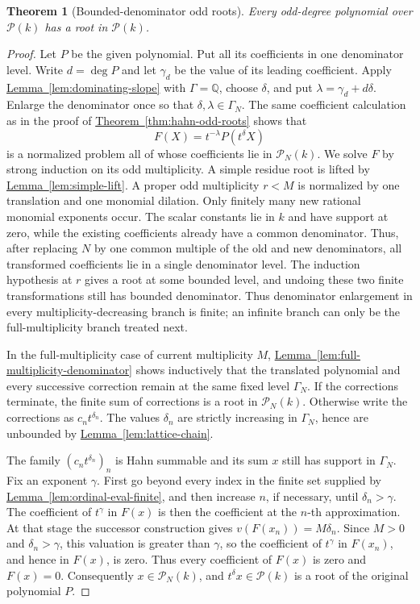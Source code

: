 \documentclass[11pt]{article}
\newcommand{\Puiseux}{\mathcal P(k)}
\newcommand{\Val}{v}
\newcommand{\namedref}[2]{\hyperref[#2]{#1~\ref*{#2}}}
\theoremstyle{proofnote}
\newtheorem{theorem}{Theorem}[section]
\begin{document}
\begin{theorem}[Bounded-denominator odd roots]
\label{thm:puiseux-odd-roots}
  Every odd-degree polynomial over \(\Puiseux\) has a root in \(\Puiseux\).
\end{theorem}
\begin{proof}
  Let \(P\) be the given polynomial.  Put all its coefficients in one
  denominator level.  Write \(d=\deg P\) and let \(\gamma_d\) be the value of
  its leading coefficient.  Apply \namedref{Lemma}{lem:dominating-slope} with
  \(\Gamma=\mathbb Q\), choose \(\delta\), and put
  \(\lambda=\gamma_d+d\delta\).  Enlarge the denominator once so that
  \(\delta,\lambda\in\Gamma_N\).  The same coefficient calculation as in
  the proof of \namedref{Theorem}{thm:hahn-odd-roots} shows that
  \[
    F(X)=t^{-\lambda}P(t^\delta X)
  \]
  is a normalized problem all of whose coefficients lie in
  \(\mathcal P_N(k)\).  We solve \(F\) by strong induction on its odd
  multiplicity.
  A simple residue root is lifted by \namedref{Lemma}{lem:simple-lift}.  A proper
  odd multiplicity \(r<M\) is normalized by one translation and one monomial
  dilation.  Only finitely many new rational monomial exponents occur.
  The scalar constants lie in \(k\) and have support at zero, while the
  existing coefficients already have a common denominator.  Thus, after
  replacing \(N\) by one common multiple of the old and new denominators,
  all transformed coefficients lie in a single denominator level.  The induction hypothesis at \(r\) gives a root
  at some bounded level, and undoing these two finite transformations still
  has bounded denominator.  Thus denominator enlargement in every
  multiplicity-decreasing branch is finite; an infinite branch can only be
  the full-multiplicity branch treated next.

  In the full-multiplicity case of current multiplicity \(M\),
  \namedref{Lemma}{lem:full-multiplicity-denominator}
  shows inductively that the translated polynomial and every successive
  correction remain at the same fixed level \(\Gamma_N\).  If the corrections
  terminate, the finite sum of corrections is a root in
  \(\mathcal P_N(k)\).  Otherwise write the corrections as
  \(c_nt^{\delta_n}\).  The values \(\delta_n\) are strictly increasing in
  \(\Gamma_N\), hence are unbounded by \namedref{Lemma}{lem:lattice-chain}.

  The family \((c_nt^{\delta_n})_n\) is Hahn summable and its sum \(x\)
  still has support in \(\Gamma_N\).  Fix an exponent \(\gamma\).  First go
  beyond every index in the finite set supplied by
  \namedref{Lemma}{lem:ordinal-eval-finite}, and then increase \(n\), if
  necessary, until \(\delta_n>\gamma\).  The coefficient of \(t^\gamma\) in
  \(F(x)\) is then the coefficient at the \(n\)-th approximation.  At that stage the
  successor construction gives \(\Val(F(x_n))=M\delta_n\).  Since \(M>0\)
  and \(\delta_n>\gamma\), this valuation is greater than \(\gamma\), so the
  coefficient of \(t^\gamma\) in \(F(x_n)\), and hence in \(F(x)\), is
  zero.  Thus every coefficient of \(F(x)\) is zero and
  \(F(x)=0\).  Consequently \(x\in\mathcal P_N(k)\), and
  \(t^\delta x\in\Puiseux\) is a root of the original polynomial \(P\).
\end{proof}
\end{document}
